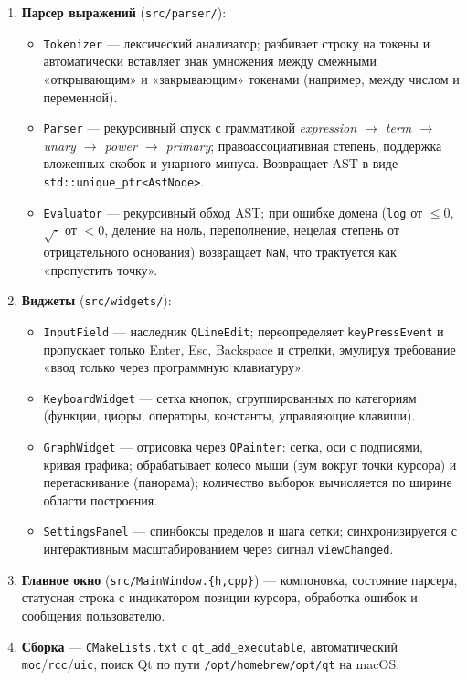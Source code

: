 \documentclass[a4paper, final]{article}
\begin{document}
\begin{enumerate}
    \item \textbf{Парсер выражений} (\texttt{src/parser/}):
    \begin{itemize}
        \item \texttt{Tokenizer} --- лексический анализатор;
              разбивает строку на токены и автоматически вставляет
              знак умножения между смежными «открывающим» и «закрывающим»
              токенами (например, между числом и переменной).
        \item \texttt{Parser} --- рекурсивный спуск с грамматикой
              \emph{expression $\to$ term $\to$ unary $\to$ power $\to$ primary};
              правоассоциативная степень, поддержка вложенных скобок и
              унарного минуса. Возвращает AST в виде \texttt{std::unique\_ptr<AstNode>}.
        \item \texttt{Evaluator} --- рекурсивный обход AST;
              при ошибке домена (\texttt{log} от $\leq 0$, $\sqrt{\cdot}$
              от $<0$, деление на ноль, переполнение, нецелая степень
              от отрицательного основания) возвращает \texttt{NaN},
              что трактуется как «пропустить точку».
    \end{itemize}
    \item \textbf{Виджеты} (\texttt{src/widgets/}):
    \begin{itemize}
        \item \texttt{InputField} --- наследник \texttt{QLineEdit};
              переопределяет \texttt{keyPressEvent} и пропускает
              только Enter, Esc, Backspace и стрелки, эмулируя
              требование «ввод только через программную клавиатуру».
        \item \texttt{KeyboardWidget} --- сетка кнопок, сгруппированных
              по категориям (функции, цифры, операторы, константы,
              управляющие клавиши).
        \item \texttt{GraphWidget} --- отрисовка через \texttt{QPainter}:
              сетка, оси с подписями, кривая графика; обрабатывает
              колесо мыши (зум вокруг точки курсора) и перетаскивание
              (панорама); количество выборок вычисляется по ширине
              области построения.
        \item \texttt{SettingsPanel} --- спинбоксы пределов и шага сетки;
              синхронизируется с интерактивным масштабированием через
              сигнал \texttt{viewChanged}.
    \end{itemize}
    \item \textbf{Главное окно} (\texttt{src/MainWindow.\{h,cpp\}}) ---
          компоновка, состояние парсера, статусная строка
          с индикатором позиции курсора, обработка ошибок и сообщения
          пользователю.
    \item \textbf{Сборка} --- \texttt{CMakeLists.txt} с \texttt{qt\_add\_executable},
          автоматический \texttt{moc}/\texttt{rcc}/\texttt{uic}, поиск Qt
          по пути \texttt{/opt/homebrew/opt/qt} на macOS.
\end{enumerate}
\end{document}
